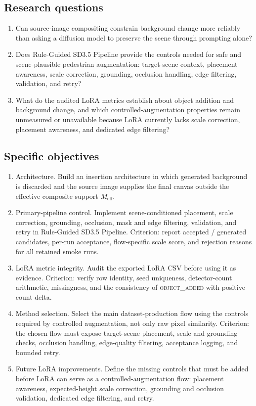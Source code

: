 \documentclass[11pt,a4paper]{article}
\begin{document}
\subsection*{Research questions}
\begin{enumerate}[label=RQ\arabic*.,leftmargin=2.4em,itemsep=2pt]
  \item Can source-image compositing constrain background change more reliably than asking a diffusion model to preserve the scene through prompting alone?
  \item Does Rule-Guided SD3.5 Pipeline provide the controls needed for safe and scene-plausible pedestrian augmentation: target-scene context, placement awareness, scale correction, grounding, occlusion handling, edge filtering, validation, and retry?
  \item What do the audited LoRA metrics establish about object addition and background change, and which controlled-augmentation properties remain unmeasured or unavailable because LoRA currently lacks scale correction, placement awareness, and dedicated edge filtering?
\end{enumerate}

\subsection*{Specific objectives}
\begin{enumerate}[leftmargin=1.8em,itemsep=4pt]
  \item Architecture. Build an insertion architecture in which generated background is discarded and the source image supplies the final canvas outside the effective composite support $M_{\mathrm{eff}}$.
  \item Primary-pipeline control. Implement scene-conditioned placement, scale correction, grounding, occlusion, mask and edge filtering, validation, and retry in Rule-Guided SD3.5 Pipeline. Criterion: report accepted / generated candidates, per-run acceptance, flow-specific scale score, and rejection reasons for all retained smoke runs.
  \item LoRA metric integrity. Audit the exported LoRA CSV before using it as evidence. Criterion: verify row identity, seed uniqueness, detector-count arithmetic, missingness, and the consistency of \textsc{object\_added} with positive count delta.
  \item Method selection. Select the main dataset-production flow using the controls required by controlled augmentation, not only raw pixel similarity. Criterion: the chosen flow must expose target-scene placement, scale and grounding checks, occlusion handling, edge-quality filtering, acceptance logging, and bounded retry.
  \item Future LoRA improvements. Define the missing controls that must be added before LoRA can serve as a controlled-augmentation flow: placement awareness, expected-height scale correction, grounding and occlusion validation, dedicated edge filtering, and retry.
\end{enumerate}
\end{document}
